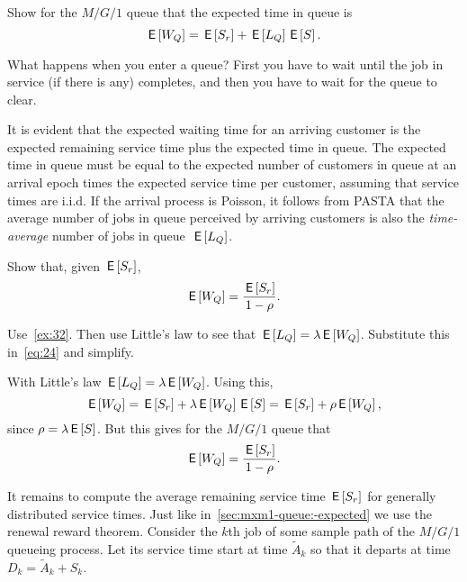 \begin{extra}
Show for the $M/G/1$ queue that the expected time in queue is
\begin{equation}\label{eq:24}
 \,\mathsf{E}\left[W_Q\right] = \,\mathsf{E}\left[S_r\right] + \,\mathsf{E}\left[L_Q\right] \,\mathsf{E}\left[S\right].
\end{equation}
\begin{hint}
 What happens when you enter a queue? First you have to wait until the job in service (if there is any) completes, and then you have to wait for the queue to clear.
\end{hint}
\begin{solution}
It is evident that the expected waiting time for an arriving customer is the expected
remaining service time plus the expected time in queue. The expected
time in queue must be equal to the expected number of
customers in queue at an arrival epoch times the expected service time
per customer, assuming that service times are i.i.d. If the arrival
process is Poisson, it follows from PASTA that the average number of
jobs in queue perceived by arriving customers is also the
\emph{time-average} number of jobs in queue~$\,\mathsf{E}\left[L_Q\right]$. 
\end{solution}
\end{extra}


\begin{exercise}
Show that, given $\,\mathsf{E}\left[S_r\right]$, 
\begin{equation}\label{eq:35}
 \E{W_Q} = \frac{\E{S_r}}{1-\rho}.%
\end{equation}
\begin{hint}
 Use~\cref{ex:32}. Then use Little's law to see that $\,\mathsf{E}\left[L_Q\right] = \lambda \,\mathsf{E}\left[W_Q\right]$. Substitute this in~\cref{eq:24} and simplify.
\end{hint}
\begin{solution}
With Little's law $\,\mathsf{E}\left[L_Q\right] = \lambda \,\mathsf{E}\left[W_Q\right]$. Using this,
\begin{equation*}
 \,\mathsf{E}\left[W_Q\right] = \,\mathsf{E}\left[S_r\right] + \lambda \,\mathsf{E}\left[W_Q\right] \,\mathsf{E}\left[S\right] =\,\mathsf{E}\left[S_r\right] + \rho \,\mathsf{E}\left[W_Q\right],
\end{equation*}
since $\rho=\lambda \,\mathsf{E}\left[S\right]$. But this gives for the $M/G/1$ queue that
\begin{equation*}
 \,\mathsf{E}\left[W_Q\right] = \frac{\,\mathsf{E}\left[S_r\right]}{1-\rho}.
\end{equation*}
\end{solution}
\end{exercise}



It remains to compute the average remaining service time $\,\mathsf{E}\left[S_r\right]$ for generally distributed service times.
Just like in~\cref{sec:mxm1-queue:-expected} we use the renewal reward theorem.
Consider the $k$th job of some sample path of the $M/G/1$ queueing process.
Let its service time start at time $\tilde A_k$ so that it departs at time $D_k=\tilde A_k + S_k$.

